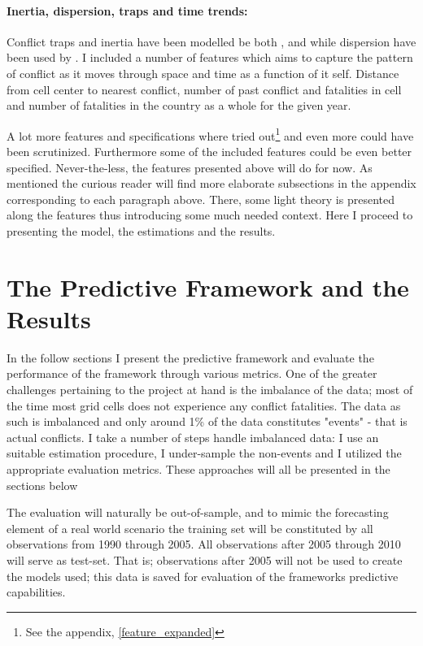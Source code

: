\documentclass[a4paper]{article}
\begin{document}
\paragraph{Inertia, dispersion, traps and time trends:} Conflict traps and inertia have been modelled be both \cite{Collier_Hoeffler_2004}, \cite{Hegre_Sambanis_2006} and \cite{Cederman_Gleditsch_Buhaug_2013} while dispersion have been used by \cite{Goldstone_2010}. I included a number of features which aims to capture the pattern of conflict as it moves through space and time as a function of it self. Distance from cell center to nearest conflict, number of past conflict and fatalities in cell and number of fatalities in the country as a whole for the given year.\par

A lot more features and specifications where tried out\footnote{See the appendix, \autoref{feature_expanded}} and even more could have been scrutinized. Furthermore some of the included features could be even better specified. Never-the-less, the features presented above will do for now. As mentioned the curious reader will find more elaborate subsections in the appendix corresponding to each paragraph above. There, some light theory is presented along the features thus introducing some much needed context. Here I proceed to presenting the model, the estimations and the results.

\section{The Predictive Framework and the Results}

In the follow sections I present the predictive framework and evaluate the performance of the framework through various metrics. One of the greater challenges pertaining to the project at hand is the imbalance of the data;  most of the time most grid cells does not experience any conflict fatalities. The data as such is imbalanced and only around 1\% of the data constitutes "events" - that is actual conflicts. I take a number of steps handle imbalanced data: I use an suitable estimation procedure, I under-sample the non-events and I utilized the appropriate evaluation metrics. These approaches will all be presented in the sections below\par

The evaluation will naturally be out-of-sample, and to mimic the forecasting element of a real world scenario the training set will be constituted by all observations from 1990 through 2005. All observations after 2005 through 2010 will serve as test-set. That is; observations after 2005 will not be used to create the models used; this data is saved for evaluation of the frameworks predictive capabilities.\par
\end{document}
